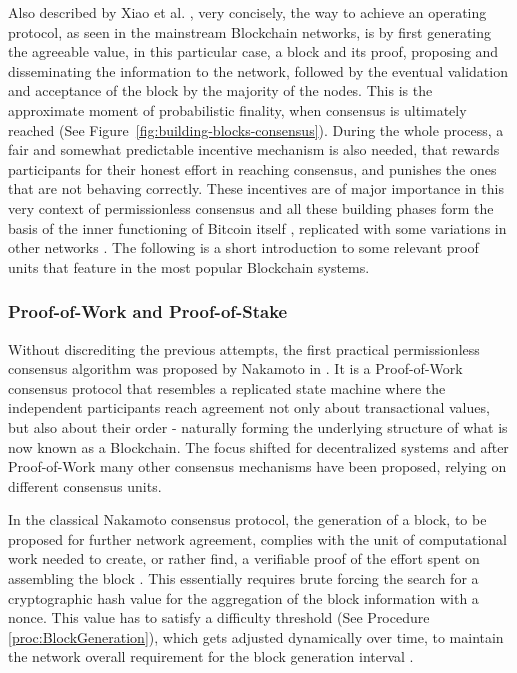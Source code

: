 Also described by Xiao et al. \cite{survey-dist-consensus}, very concisely, the way to achieve an operating protocol, as seen in the mainstream Blockchain networks, is by first generating the agreeable value, in this particular case, a block and its proof, proposing and disseminating the information to the network, followed by the eventual validation and acceptance of the block by the majority of the nodes. This is the approximate moment of probabilistic finality, when consensus is ultimately reached (See Figure~\ref{fig:building-blocks-consensus}). During the whole process, a fair and somewhat predictable incentive mechanism is also needed, that rewards participants for their honest effort in reaching consensus, and punishes the ones that are not behaving correctly. These incentives are of major importance in this very context of permissionless consensus and all these building phases form the basis of the inner functioning of Bitcoin itself \cite{nakamoto2008bitcoin}, replicated with some variations in other networks \cite{buterin2014next, survey-dist-consensus}. The following is a short introduction to some relevant proof units that feature in the most popular Blockchain systems.

\subsubsection{Proof-of-Work and Proof-of-Stake}

Without discrediting the previous attempts, the first practical permissionless consensus algorithm was proposed by Nakamoto in \cite{nakamoto2008bitcoin}. It is a Proof-of-Work consensus protocol that resembles a replicated state machine where the independent participants reach agreement not only about transactional values, but also about their order - naturally forming the underlying structure of what is now known as a Blockchain. The focus shifted for decentralized systems and after Proof-of-Work many other consensus mechanisms have been proposed, relying on different consensus units.

In the classical Nakamoto consensus protocol, the generation of a block, to be proposed for further network agreement, complies with the unit of computational work needed to create, or rather find, a verifiable proof of the effort spent on assembling the block \cite{nakamoto2008bitcoin}. This essentially requires brute forcing the search for a cryptographic hash value for the aggregation of the block information with a nonce. This value has to satisfy a difficulty threshold (See Procedure \ref{proc:BlockGeneration}), which gets adjusted dynamically over time, to maintain the network overall requirement for the block generation interval \cite{8629877, survey-dist-consensus}.

